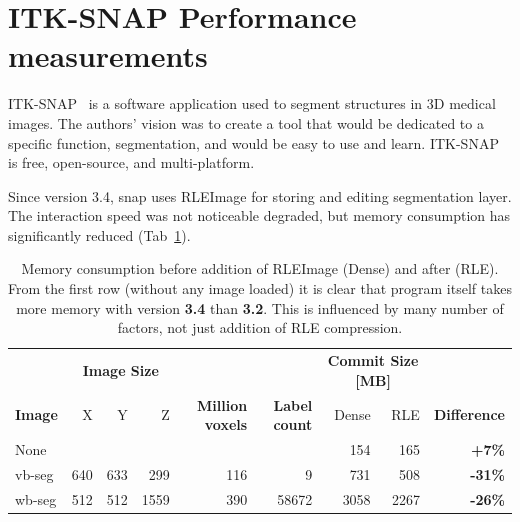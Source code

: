 \documentclass{InsightArticle}
\begin{document}
\section{ITK-SNAP Performance measurements}

ITK-SNAP~\cite{py06nimg} is a software application used to segment structures in 3D medical images.
The authors' vision was to create a tool that would be dedicated to a specific function,
segmentation, and would be easy to use and learn.
ITK-SNAP is free, open-source, and multi-platform.

Since version 3.4, snap uses RLEImage for storing and editing segmentation layer.
The interaction speed was not noticeable degraded,
but memory consumption has significantly reduced (Tab~\ref{tab:memoryConsumption}).

\begin{table}[h]
    \centering
    \begin{tabular}{lrrrrrrrr}
                   & \multicolumn{3}{c}{\textbf{Image Size}} &                                              &                                           & \multicolumn{2}{c}{\textbf{Commit Size {[}MB{]}}} &                                \\
    \textbf{Image} & X           & Y           & Z           & \multirow{-2}{12mm}{\textbf{Million voxels}} & \multirow{-2}{1 cm}{\textbf{Label count}} & Dense                    & RLE                    & \textbf{Difference}            \\
    None           &             &             &             &                                              &                                           & 154                      & 165                    & {\color{red} \textbf{+7\%}}    \\
    vb-seg         & 640         & 633         & 299         & 116                                          & 9                                         & 731                      & 508                    & {\color{green} \textbf{-31\%}} \\
    wb-seg         & 512         & 512         & 1559        & 390                                          & 58672                                     & 3058                     & 2267                   & {\color{green} \textbf{-26\%}}
    \end{tabular}
    \caption{Memory consumption before addition of RLEImage (Dense) and after (RLE).
    From the first row (without any image loaded) it is clear that
    program itself takes more memory with version \textbf{3.4} than \textbf{3.2}.
    This is influenced by many number of factors, not just addition of RLE compression.}
    \label{tab:memoryConsumption}
\end{table}
\end{document}
